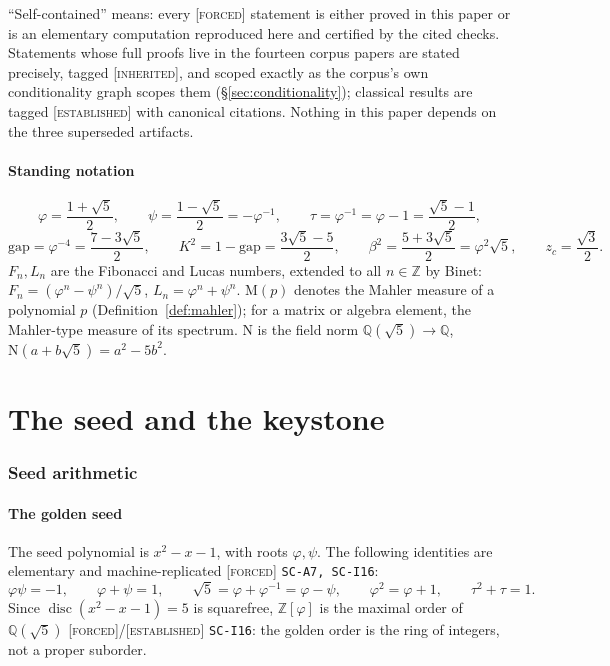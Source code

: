 \documentclass[11pt]{article}
\newcommand{\tagF}{\textcolor{cF}{\textsc{[forced]}}}
\newcommand{\tagI}{\textcolor{cI}{\textsc{[inherited]}}}
\newcommand{\tagE}{\textcolor{cE}{\textsc{[established]}}}
\newcommand{\hx}[1]{\textcolor{cC}{\footnotesize\texttt{#1}}}
\newcommand{\Q}{\mathbb{Q}}
\newcommand{\Z}{\mathbb{Z}}
\newcommand{\gp}{\varphi}
\newcommand{\gq}{\psi}
\newcommand{\gapc}{\mathrm{gap}}
\newcommand{\M}{\mathrm{M}}
\newcommand{\Nm}{\mathrm{N}}
\theoremstyle{plain}
\theoremstyle{definition}
\theoremstyle{remark}
\begin{document}
``Self-contained'' means: every \tagF{} statement is either proved in this paper or is
an elementary computation reproduced here and certified by the cited checks. Statements
whose full proofs live in the fourteen corpus papers are stated precisely, tagged
\tagI{}, and scoped exactly as the corpus's own conditionality graph scopes them
(\S\ref{sec:conditionality}); classical results are tagged \tagE{} with canonical
citations. Nothing in this paper depends on the three superseded artifacts.

\subsection{Standing notation}\label{sec:notation}
\[
\gp=\frac{1+\sqrt5}{2},\qquad
\gq=\frac{1-\sqrt5}{2}=-\gp^{-1},\qquad
\tau=\gp^{-1}=\gp-1=\frac{\sqrt5-1}{2},
\]
\[
\gapc=\gp^{-4}=\frac{7-3\sqrt5}{2},\qquad
K^2=1-\gapc=\frac{3\sqrt5-5}{2},\qquad
\beta^2=\frac{5+3\sqrt5}{2}=\gp^2\sqrt5,\qquad
z_c=\frac{\sqrt3}{2}.
\]
$F_n,L_n$ are the Fibonacci and Lucas numbers, extended to all $n\in\Z$ by Binet:
$F_n=(\gp^n-\gq^n)/\sqrt5$, $L_n=\gp^n+\gq^n$. $\M(p)$ denotes the Mahler measure of a
polynomial $p$ (Definition~\ref{def:mahler}); for a matrix or algebra element, the
Mahler-type measure of its spectrum. $\Nm$ is the field norm
$\Q(\sqrt5)\to\Q$, $\Nm(a+b\sqrt5)=a^2-5b^2$.

\part{The seed and the keystone}

\section{Seed arithmetic}\label{sec:seed}

\subsection{The golden seed}
The seed polynomial is $x^2-x-1$, with roots $\gp,\gq$. The following identities are
elementary and machine-replicated \tagF{} \hx{SC-A7, SC-I16}:
\begin{equation}\label{eq:goldenids}
\gp\gq=-1,\qquad \gp+\gq=1,\qquad \sqrt5=\gp+\gp^{-1}=\gp-\gq,\qquad
\gp^2=\gp+1,\qquad \tau^2+\tau=1 .
\end{equation}
Since $\operatorname{disc}(x^2-x-1)=5$ is squarefree, $\Z[\gp]$ is the maximal order
of $\Q(\sqrt5)$ \tagF{}/\tagE{} \hx{SC-I16}: the golden order is the ring of integers,
not a proper suborder.
\end{document}

